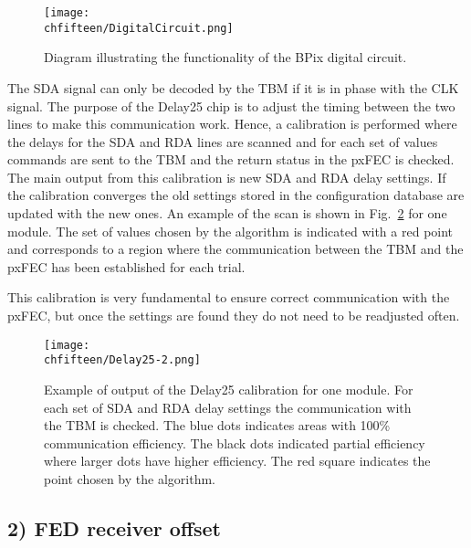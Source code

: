 \begin{figure}[!htb]
 \begin{center}
 \texttt{[image: \\chfifteen/DigitalCircuit.png]}
 \end{center}
 \caption{Diagram illustrating the functionality of the BPix digital circuit.}
 \label{fig:DigitalCircuit}
\end{figure}

The SDA signal can only be decoded by the TBM if it is in phase with the CLK signal. The purpose of the Delay25 chip is to adjust the timing between the two lines to make this communication work.
Hence, a calibration is performed where the delays for the SDA and RDA lines are scanned and for each set of values commands are sent to the TBM and the return status in the pxFEC is checked.
The main output from this calibration is new SDA and RDA delay settings. If the calibration converges the old settings stored in the configuration database are updated with the new ones.
An example of the scan is shown in Fig.~\ref{fig:Delay25} for one module.
The set of values chosen by the algorithm is indicated with a red point and corresponds to a region where the communication between the TBM and the pxFEC has been established for each trial.

This calibration is very fundamental to ensure correct communication with the pxFEC, but once the settings are found they do not need to be readjusted often.

\begin{figure}[!htb]
 \begin{center}
 \texttt{[image: \\chfifteen/Delay25-2.png]}
 \end{center}
 \caption{Example of output of the Delay25 calibration for one module. For each set of SDA and RDA delay settings the communication with the TBM is checked. The blue dots indicates areas with 100\% communication efficiency. The black dots indicated partial efficiency where larger dots have higher efficiency. The red square indicates the point chosen by the algorithm.}
 \label{fig:Delay25}
\end{figure}

\subsection*{2) FED receiver offset}


